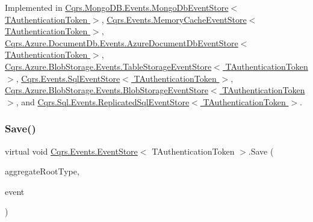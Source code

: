 Implemented in \hyperlink{classCqrs_1_1MongoDB_1_1Events_1_1MongoDbEventStore_a13f6823671d7cb9c042d8f7156a51b89_a13f6823671d7cb9c042d8f7156a51b89}{Cqrs.\+Mongo\+D\+B.\+Events.\+Mongo\+Db\+Event\+Store$<$ T\+Authentication\+Token $>$}, \hyperlink{classCqrs_1_1Events_1_1MemoryCacheEventStore_a9b1a1aaab34770bd68ebcedca0fc40b0_a9b1a1aaab34770bd68ebcedca0fc40b0}{Cqrs.\+Events.\+Memory\+Cache\+Event\+Store$<$ T\+Authentication\+Token $>$}, \hyperlink{classCqrs_1_1Azure_1_1DocumentDb_1_1Events_1_1AzureDocumentDbEventStore_afe494469614082cf667f5cf4b6c4a97b_afe494469614082cf667f5cf4b6c4a97b}{Cqrs.\+Azure.\+Document\+Db.\+Events.\+Azure\+Document\+Db\+Event\+Store$<$ T\+Authentication\+Token $>$}, \hyperlink{classCqrs_1_1Azure_1_1BlobStorage_1_1Events_1_1TableStorageEventStore_ae63921d0ace265b1b269c865080b5712_ae63921d0ace265b1b269c865080b5712}{Cqrs.\+Azure.\+Blob\+Storage.\+Events.\+Table\+Storage\+Event\+Store$<$ T\+Authentication\+Token $>$}, \hyperlink{classCqrs_1_1Events_1_1SqlEventStore_a8d67570d50a97050cbce5a29d7a4b9f6_a8d67570d50a97050cbce5a29d7a4b9f6}{Cqrs.\+Events.\+Sql\+Event\+Store$<$ T\+Authentication\+Token $>$}, \hyperlink{classCqrs_1_1Azure_1_1BlobStorage_1_1Events_1_1BlobStorageEventStore_aa27a352076b8967498407d24814f7c83_aa27a352076b8967498407d24814f7c83}{Cqrs.\+Azure.\+Blob\+Storage.\+Events.\+Blob\+Storage\+Event\+Store$<$ T\+Authentication\+Token $>$}, and \hyperlink{classCqrs_1_1Sql_1_1Events_1_1ReplicatedSqlEventStore_a51c9b1329327e456a251aa2d910fc7ae_a51c9b1329327e456a251aa2d910fc7ae}{Cqrs.\+Sql.\+Events.\+Replicated\+Sql\+Event\+Store$<$ T\+Authentication\+Token $>$}.

\mbox{\label{classCqrs_1_1Events_1_1EventStore_a3ba5ba04a36382b6d36a6ad8867dc766_a3ba5ba04a36382b6d36a6ad8867dc766}} 
\subsubsection{\texorpdfstring{Save()}{Save()}}
{\footnotesize\ttfamily virtual void \hyperlink{classCqrs_1_1Events_1_1EventStore}{Cqrs.\+Events.\+Event\+Store}$<$ T\+Authentication\+Token $>$.Save (\begin{DoxyParamCaption}\item[{Type}]{aggregate\+Root\+Type,  }\item[{\hyperlink{interfaceCqrs_1_1Events_1_1IEvent}{I\+Event}$<$ T\+Authentication\+Token $>$ @}]{event }\end{DoxyParamCaption})\hspace{0.3cm}{\ttfamily [virtual]}}



